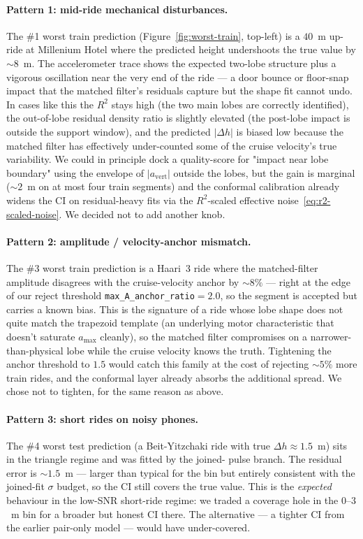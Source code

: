 \paragraph{Pattern 1: mid-ride mechanical disturbances.} The \#1
worst train prediction (Figure~\ref{fig:worst-train}, top-left) is
a $40$~m up-ride at Millenium Hotel where the predicted height
undershoots the true value by $\sim 8$~m. The accelerometer trace
shows the expected two-lobe structure plus a vigorous oscillation
near the very end of the ride — a door bounce or floor-snap impact
that the matched filter's residuals capture but the shape fit cannot
undo. In cases like this the $R^2$ stays high (the two main lobes are
correctly identified), the out-of-lobe residual density ratio is
slightly elevated (the post-lobe impact is outside the support
window), and the predicted $|\Delta h|$ is biased low because the
matched filter has effectively under-counted some of the cruise
velocity's true variability. We could in principle dock a
quality-score for "impact near lobe boundary" using the envelope
of $|a_\mathrm{vert}|$ outside the lobes, but the gain is marginal
($\sim 2$~m on at most four train segments) and the conformal
calibration already widens the CI on residual-heavy fits via the
$R^2$-scaled effective noise~\eqref{eq:r2-scaled-noise}. We decided
not to add another knob.

\paragraph{Pattern 2: amplitude / velocity-anchor mismatch.} The
\#3 worst train prediction is a Haari~3 ride where the matched-filter
amplitude disagrees with the cruise-velocity anchor by $\sim 8\%$ —
right at the edge of our reject threshold
\texttt{max\_A\_anchor\_ratio}$=2.0$, so the segment is accepted but
carries a known bias. This is the signature of a ride whose lobe
shape does not quite match the trapezoid template (an underlying
motor characteristic that doesn't saturate $a_\mathrm{max}$ cleanly),
so the matched filter compromises on a narrower-than-physical lobe
while the cruise velocity knows the truth. Tightening the anchor
threshold to $1.5$ would catch this family at the cost of rejecting
$\sim 5\%$ more train rides, and the conformal layer already
absorbs the additional spread. We chose not to tighten, for the
same reason as above.

\paragraph{Pattern 3: short rides on noisy phones.} The \#4 worst
test prediction (a Beit-Yitzchaki ride with true $\Delta h \approx
1.5$~m) sits in the triangle regime and was fitted by the joined-
pulse branch. The residual error is $\sim 1.5$~m — larger than
typical for the bin but entirely consistent with the joined-fit
$\sigma$ budget, so the CI still covers the true value. This is the
\emph{expected} behaviour in the low-SNR short-ride regime: we
traded a coverage hole in the $0$--$3$~m bin for a broader but
honest CI there. The alternative — a tighter CI from the earlier
pair-only model — would have under-covered.

